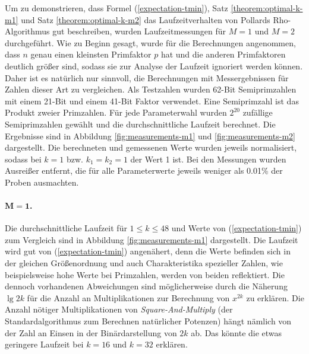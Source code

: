 \documentclass[a4paper, 10pt, ngerman]{article}
\begin{document}
    Um zu demonstrieren, dass Formel (\ref{expectation-tmin}), Satz \ref{theorem:optimal-k-m1} und Satz \ref{theorem:optimal-k-m2} das Laufzeitverhalten von Pollards Rho-Algorithmus gut beschreiben, wurden Laufzeitmessungen für $M = 1$ und $M = 2$ durchgeführt. Wie zu Beginn gesagt, wurde für die Berechnungen angenommen, dass $n$ genau einen kleinsten Primfaktor $p$ hat und die anderen Primfaktoren deutlich größer sind, sodass sie zur Analyse der Laufzeit ignoriert werden können. Daher ist es natürlich nur sinnvoll, die Berechnungen mit Messergebnissen für Zahlen dieser Art zu vergleichen. Als Testzahlen wurden 62-Bit Semiprimzahlen mit einem 21-Bit und einem 41-Bit Faktor verwendet. Eine Semiprimzahl ist das Produkt zweier Primzahlen. Für jede Parameterwahl wurden $2^{20}$ zufällige Semiprimzahlen gewählt und die durchschnittliche Laufzeit berechnet. Die Ergebnisse sind in Abbildung \ref{fig:measurements-m1} und \ref{fig:measurements-m2} dargestellt. Die berechneten und gemessenen Werte wurden jeweils normalisiert, sodass bei $k = 1$ bzw. $k_1 = k_2 = 1$ der Wert 1 ist. Bei den Messungen wurden Ausreißer entfernt, die für alle Parameterwerte jeweils weniger als 0.01\% der Proben ausmachten.

    \paragraph{$\bm{M = 1}$.} Die durchschnittliche Laufzeit für $1 \le k \le 48$ und Werte von (\ref{expectation-tmin}) zum Vergleich sind in Abbildung \ref{fig:measurements-m1} dargestellt. Die Laufzeit wird gut von (\ref{expectation-tmin}) angenähert, denn die Werte befinden sich in der gleichen Größenordnung und auch Charakteristika spezieller Zahlen, wie beispielsweise hohe Werte bei Primzahlen, werden von beiden reflektiert. Die dennoch vorhandenen Abweichungen sind möglicherweise durch die Näherung $\lg 2k$ für die Anzahl an Multiplikationen zur Berechnung von $x^{2k}$ zu erklären. Die Anzahl nötiger Multiplikationen von \emph{Square-And-Multiply} (der Standardalgorithmus zum Berechnen natürlicher Potenzen) hängt nämlich von der Zahl an Einsen in der Binärdarstellung von $2k$ ab. Das könnte die etwas geringere Laufzeit bei $k = 16$ und $k = 32$ erklären.
\end{document}
